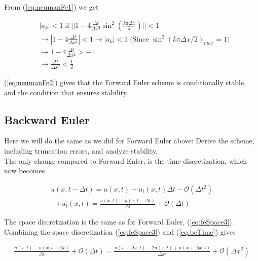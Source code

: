 \documentclass{article}
\begin{document}
From (\ref{eq:neumanFe1}) we get
 
\begin{subequations}
	\begin{align}
		 &|a_k| < 1\; \text{if}\; ||1 - 4\frac{\Delta t}{\Delta x^2} \sin^2(\frac{k\pi\Delta x}{2})|| < 1 \\
		 &\rightarrow |1 - 4 \frac{\Delta t}{\Delta x^2}| < 1 \rightarrow |a_k| < 1\;\text{(Since $\sin^2(k \pi \Delta x/2)_{max}  = 1$)}\\
		 &\rightarrow 1 - 4 \frac{\Delta t}{\Delta x^2} > -1\\ 
		 &\rightarrow \frac{\Delta t}{\Delta x^2} < \frac{1}{2}\label{eq:neumanFe2}
	\end{align}
\end{subequations}

(\ref{eq:neumanFe2}) gives that the Forward Euler scheme is conditionally stable, and the condition that ensures stability.


\subsection{Backward Euler}
Here we will do the same as we did for Forward Euler above: Derive the scheme, including truncation errors, and analyze stability.\\

The only change compared to Forward Euler, is the time discretization, which now becomes

\begin{subequations}
	\begin{align}
	u(x, t- \Delta t)  = u(x,t) +  u_t(x,t) \Delta t - \mathcal{O}(\Delta t^2)\\
	\rightarrow u_t(x,t) = \frac{u(x, t) - u(x,t - \Delta t)}{\Delta t} + \mathcal{O}(\Delta t)\label{eq:beTime}
	\end{align}
\end{subequations}

The space discretization is the same as for Forward Euler, (\ref{eq:feSpace3}). Combining the space discretization (\ref{eq:feSpace3}) and (\ref{eq:beTime}) gives

\begin{subequations}
	\begin{align}
		\frac{u(x, t) - u(x,t - \Delta t)}{\Delta t} + \mathcal{O}(\Delta t) = \frac{u(x - \Delta x, t) - 2u(x,t) + u(x+ \Delta x, t)}{\Delta x^2} + \mathcal{O}(\Delta x^2)\label{eq:be1}
	\end{align}
\end{subequations}
\end{document}
